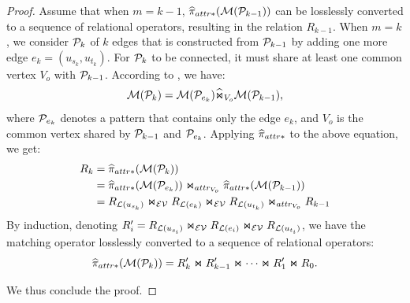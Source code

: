 \begin{proof}
Assume that when $m = k-1$, $\widehat{\pi}_{attr*}(\mathcal{M}(\mathcal{P}_{k-1}))$ can be losslessly converted to a sequence of relational operators, resulting in the relation $R_{k-1}$. When $m = k$, we consider $\mathcal{P}_{k}$ of $k$ edges that is constructed from $\mathcal{P}_{k-1}$ by adding one more edge $e_k = (u_{s_k}, u_{t_k})$. For $\mathcal{P}_{k}$ to be connected, it must share at least one common vertex $V_o$ with $\mathcal{P}_{k-1}$. According to , we have:
\[ \mathcal{M}(\mathcal{P}_{k}) =  \mathcal{M}(\mathcal{P}_{e_k}) \widehat{\Join}_{V_o} \mathcal{M}(\mathcal{P}_{k-1}), \]
where $\mathcal{P}_{e_k}$ denotes a pattern that contains only the edge $e_k$, and $V_o$ is the common vertex shared by $\mathcal{P}_{k-1}$ and $\mathcal{P}_{e_k}$. Applying $\widehat{\pi}_{attr*}$ to the above equation, we get:
\begin{equation*}
\begin{split}
R_k &= \widehat{\pi}_{attr*}(\mathcal{M}(\mathcal{P}_{k})) \\
    &= \widehat{\pi}_{attr*}(\mathcal{M}(\mathcal{P}_{e_k})) \Join_{attr_{V_o}}  \widehat{\pi}_{attr*}(\mathcal{M}(\mathcal{P}_{k-1})) \\
    &= {R_{\mathcal{L}(u_{s_k})}} \Join_\mathcal{EV} {R_{\mathcal{L}(e_k)}} \Join_\mathcal{EV} {R_{\mathcal{L}(u_{t_k})}} \Join_{attr_{V_o}} R_{k-1}
\end{split}
\end{equation*}
By induction, denoting $R'_i = {R_{\mathcal{L}(u_{s_i})}} \Join_\mathcal{EV} {R_{\mathcal{L}(e_i)}} \Join_\mathcal{EV} {R_{\mathcal{L}(u_{t_i})}}$, we have the matching operator losslessly converted to a sequence of relational operators:
\begin{equation}
    \label{eq:graph-agnostic}
    \widehat{\pi}_{attr*}(\mathcal{M}(\mathcal{P}_{k})) = R'_k \Join R'_{k-1} \Join \cdots \Join R'_1 \Join R_0.
\end{equation}

We thus conclude the proof.
\end{proof}


